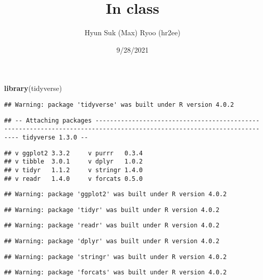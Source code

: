 \documentclass[]{article}
\title{In class}
\author{Hyun Suk (Max) Ryoo (hr2ee)}
\date{9/28/2021}
\newenvironment{Shaded}{\begin{snugshade}}{\end{snugshade}}
\newcommand{\KeywordTok}[1]{\textcolor[rgb]{0.13,0.29,0.53}{\textbf{#1}}}
\newcommand{\NormalTok}[1]{#1}
\begin{document}
\maketitle

\begin{Shaded}
\begin{Highlighting}[]
\KeywordTok{library}\NormalTok{(tidyverse)}
\end{Highlighting}
\end{Shaded}

\begin{verbatim}
## Warning: package 'tidyverse' was built under R version 4.0.2
\end{verbatim}

\begin{verbatim}
## -- Attaching packages ----------------------------------------------------------------------------------------------------------------------- tidyverse 1.3.0 --
\end{verbatim}

\begin{verbatim}
## v ggplot2 3.3.2     v purrr   0.3.4
## v tibble  3.0.1     v dplyr   1.0.2
## v tidyr   1.1.2     v stringr 1.4.0
## v readr   1.4.0     v forcats 0.5.0
\end{verbatim}

\begin{verbatim}
## Warning: package 'ggplot2' was built under R version 4.0.2
\end{verbatim}

\begin{verbatim}
## Warning: package 'tidyr' was built under R version 4.0.2
\end{verbatim}

\begin{verbatim}
## Warning: package 'readr' was built under R version 4.0.2
\end{verbatim}

\begin{verbatim}
## Warning: package 'dplyr' was built under R version 4.0.2
\end{verbatim}

\begin{verbatim}
## Warning: package 'stringr' was built under R version 4.0.2
\end{verbatim}

\begin{verbatim}
## Warning: package 'forcats' was built under R version 4.0.2
\end{verbatim}
\end{document}
